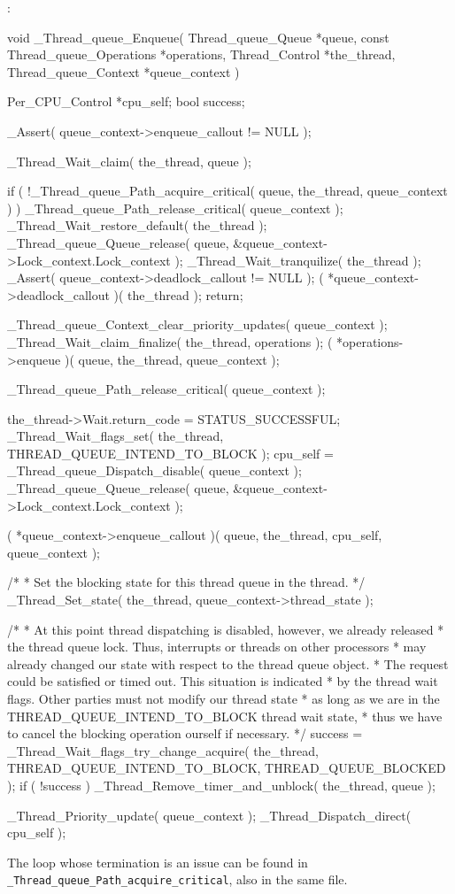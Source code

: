 \threadqenqueueC:
\begin{nicec}
void _Thread_queue_Enqueue(
  Thread_queue_Queue            *queue,
  const Thread_queue_Operations *operations,
  Thread_Control                *the_thread,
  Thread_queue_Context          *queue_context
)
{
  Per_CPU_Control *cpu_self;
  bool             success;

  _Assert( queue_context->enqueue_callout != NULL );

  _Thread_Wait_claim( the_thread, queue );

  if ( !_Thread_queue_Path_acquire_critical( queue, the_thread, queue_context ) ) {
    _Thread_queue_Path_release_critical( queue_context );
    _Thread_Wait_restore_default( the_thread );
    _Thread_queue_Queue_release( queue, &queue_context->Lock_context.Lock_context );
    _Thread_Wait_tranquilize( the_thread );
    _Assert( queue_context->deadlock_callout != NULL );
    ( *queue_context->deadlock_callout )( the_thread );
    return;
  }

  _Thread_queue_Context_clear_priority_updates( queue_context );
  _Thread_Wait_claim_finalize( the_thread, operations );
  ( *operations->enqueue )( queue, the_thread, queue_context );

  _Thread_queue_Path_release_critical( queue_context );

  the_thread->Wait.return_code = STATUS_SUCCESSFUL;
  _Thread_Wait_flags_set( the_thread, THREAD_QUEUE_INTEND_TO_BLOCK );
  cpu_self = _Thread_queue_Dispatch_disable( queue_context );
  _Thread_queue_Queue_release( queue, &queue_context->Lock_context.Lock_context );

  ( *queue_context->enqueue_callout )(
    queue,
    the_thread,
    cpu_self,
    queue_context
  );

  /*
   *  Set the blocking state for this thread queue in the thread.
   */
  _Thread_Set_state( the_thread, queue_context->thread_state );

  /*
   * At this point thread dispatching is disabled, however, we already released
   * the thread queue lock.  Thus, interrupts or threads on other processors
   * may already changed our state with respect to the thread queue object.
   * The request could be satisfied or timed out.  This situation is indicated
   * by the thread wait flags.  Other parties must not modify our thread state
   * as long as we are in the THREAD_QUEUE_INTEND_TO_BLOCK thread wait state,
   * thus we have to cancel the blocking operation ourself if necessary.
   */
  success = _Thread_Wait_flags_try_change_acquire(
    the_thread,
    THREAD_QUEUE_INTEND_TO_BLOCK,
    THREAD_QUEUE_BLOCKED
  );
  if ( !success ) {
    _Thread_Remove_timer_and_unblock( the_thread, queue );
  }

  _Thread_Priority_update( queue_context );
  _Thread_Dispatch_direct( cpu_self );
}
\end{nicec}
The loop whose termination  is an issue can be found in
\verb"_Thread_queue_Path_acquire_critical",
also in the same file.

